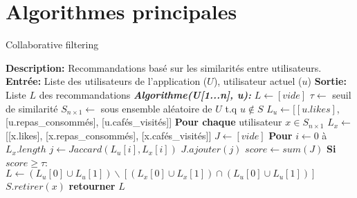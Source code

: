 \documentclass[11pt]{article}
\begin{document}
\section{Algorithmes principales}
\begin{algorithm}
    \caption{Collaborative filtering}
    \begin{algorithmic}[1]
        \Statex \textbf{Description:} Recommandations basé sur les similarités entre utilisateurs.
        \Statex \textbf{Entrée:} Liste des utilisateurs de l'application ($U$), utilisateur actuel ($u$)
        \Statex \textbf{Sortie:} Liste $L$ des recommandations
        \State \textbf{\textit{Algorithme(U[1...n], u):}}
        \State \hspace{0.5cm} $L \leftarrow [vide]$
        \State \hspace{0.5cm} $\tau \leftarrow$ seuil de similarité 
        \State \hspace{0.5cm} $S_{n\times 1} \leftarrow$ sous ensemble aléatoire de $U$ t.q $u \notin S$
        \State \hspace{0.5cm} $L_u \leftarrow [[u.likes]$, [u.repas\_consommés], [u.cafés\_visités]]
        \State \hspace{0.5cm} \textbf{Pour chaque} utilisateur $x\in S_{n\times 1}$
        \State \hspace{1cm} $L_x \leftarrow$ [[x.likes], [x.repas\_consommés], [x.cafés\_visités]]
        \State \hspace{1cm} $J \leftarrow [vide]$
        \State \hspace{1cm} \textbf{Pour} $i \leftarrow 0$ à $L_x.length$
        \State \hspace{1.5cm} $j \leftarrow Jaccard(L_u[i], L_x[i])$
        \State \hspace{1.5cm} $J.ajouter(j)$
        \State \hspace{1cm} $score \leftarrow sum(J)$
        \State \hspace{1cm} \textbf{Si} $score \geq \tau$:
        \State \hspace{1.5cm} $L \leftarrow (L_u[0] \cup L_u[1]) \backslash [(L_x[0] \cup L_x[1]) \cap (L_u[0] \cup L_u[1])]$
        \State \hspace{1cm} $S.retirer(x)$
        \State \hspace{0.5cm} \textbf{retourner} $L$
    \end{algorithmic}
\end{algorithm}
\end{document}
